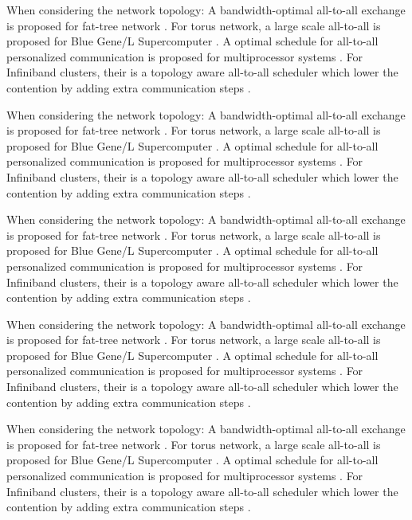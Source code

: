When considering the network topology: A bandwidth-optimal all-to-all exchange is proposed for fat-tree network \cite{prisacari2013bandwidth}. 
For torus network, a large scale all-to-all is proposed for Blue Gene/L Supercomputer \cite{kumar2008optimization}.  
A optimal schedule for all-to-all personalized communication is proposed for multiprocessor systems \cite{saha2019optimal}. 
For Infiniband clusters, their is a topology aware all-to-all scheduler which lower the contention by adding extra communication steps \cite{subramoni2014designing}.

When considering the network topology: A bandwidth-optimal all-to-all exchange is proposed for fat-tree network \cite{prisacari2013bandwidth}. 
For torus network, a large scale all-to-all is proposed for Blue Gene/L Supercomputer \cite{kumar2008optimization}.  
A optimal schedule for all-to-all personalized communication is proposed for multiprocessor systems \cite{saha2019optimal}. 
For Infiniband clusters, their is a topology aware all-to-all scheduler which lower the contention by adding extra communication steps \cite{subramoni2014designing}.

When considering the network topology: A bandwidth-optimal all-to-all exchange is proposed for fat-tree network \cite{prisacari2013bandwidth}. 
For torus network, a large scale all-to-all is proposed for Blue Gene/L Supercomputer \cite{kumar2008optimization}.  
A optimal schedule for all-to-all personalized communication is proposed for multiprocessor systems \cite{saha2019optimal}. 
For Infiniband clusters, their is a topology aware all-to-all scheduler which lower the contention by adding extra communication steps \cite{subramoni2014designing}.

When considering the network topology: A bandwidth-optimal all-to-all exchange is proposed for fat-tree network \cite{prisacari2013bandwidth}. 
For torus network, a large scale all-to-all is proposed for Blue Gene/L Supercomputer \cite{kumar2008optimization}.  
A optimal schedule for all-to-all personalized communication is proposed for multiprocessor systems \cite{saha2019optimal}. 
For Infiniband clusters, their is a topology aware all-to-all scheduler which lower the contention by adding extra communication steps \cite{subramoni2014designing}.

When considering the network topology: A bandwidth-optimal all-to-all exchange is proposed for fat-tree network \cite{prisacari2013bandwidth}. 
For torus network, a large scale all-to-all is proposed for Blue Gene/L Supercomputer \cite{kumar2008optimization}.  
A optimal schedule for all-to-all personalized communication is proposed for multiprocessor systems \cite{saha2019optimal}. 
For Infiniband clusters, their is a topology aware all-to-all scheduler which lower the contention by adding extra communication steps \cite{subramoni2014designing}.

